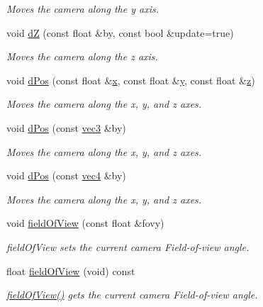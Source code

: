 \begin{DoxyCompactItemize}
\begin{DoxyCompactList}\small\item\em Moves the camera along the y axis. \end{DoxyCompactList}\item 
void \hyperlink{class_camera_ab94ed9b3c7e12f484d6bfa5f827b59ff}{d\-Z} (const float \&by, const bool \&update=true)
\begin{DoxyCompactList}\small\item\em Moves the camera along the z axis. \end{DoxyCompactList}\item 
void \hyperlink{class_camera_a2ac5f89b4f9f012dead66980925143c0}{d\-Pos} (const float \&\hyperlink{class_camera_a14d59ca64bf258adacbed4e0e70ba701}{x}, const float \&\hyperlink{class_camera_a5021b8379a853f306851837178856db0}{y}, const float \&\hyperlink{class_camera_a4acfa20291c83f13c98781c0d53cdbd8}{z})
\begin{DoxyCompactList}\small\item\em Moves the camera along the x, y, and z axes. \end{DoxyCompactList}\item 
void \hyperlink{class_camera_a928de59670f0b31264307a8a0888b99d}{d\-Pos} (const \hyperlink{struct_angel_1_1vec3}{vec3} \&by)
\begin{DoxyCompactList}\small\item\em Moves the camera along the x, y, and z axes. \end{DoxyCompactList}\item 
void \hyperlink{class_camera_a4ec2e3d2a66826aedb1ac1eee7da0b96}{d\-Pos} (const \hyperlink{struct_angel_1_1vec4}{vec4} \&by)
\begin{DoxyCompactList}\small\item\em Moves the camera along the x, y, and z axes. \end{DoxyCompactList}\item 
void \hyperlink{class_camera_a36ec0e0e832f789e27d42e7bd4f6d174}{field\-Of\-View} (const float \&fovy)
\begin{DoxyCompactList}\small\item\em field\-Of\-View sets the current camera Field-\/of-\/view angle. \end{DoxyCompactList}\item 
float \hyperlink{class_camera_a9b3675bf6866a67f8fa802bb4aecba89}{field\-Of\-View} (void) const 
\begin{DoxyCompactList}\small\item\em \hyperlink{class_camera_a9b3675bf6866a67f8fa802bb4aecba89}{field\-Of\-View()} gets the current camera Field-\/of-\/view angle. \end{DoxyCompactList}\item 

\end{DoxyCompactItemize}
